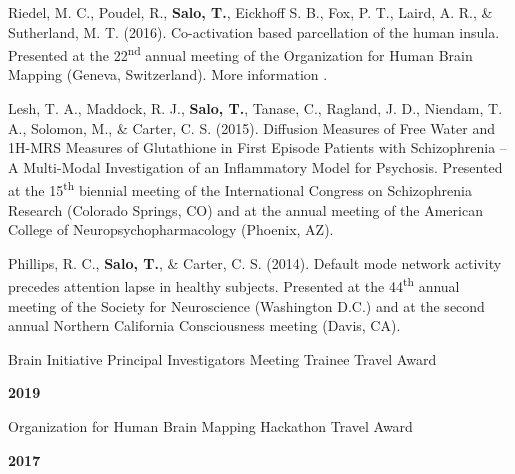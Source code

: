 \documentclass[10pt]{article}
\newcommand{\sectionstyle}{\LARGE \fontfamily{lmr}\selectfont}
\newcommand{\textlink}[3][blue]{\href{#2}{\color{#1}{#3}}}
\begin{document}
\begin{hangparas}{.25in}{1}
	\bigskip

	Riedel, M. C., Poudel, R., \textbf{Salo, T.}, Eickhoff S. B., Fox, P. T.,
	Laird, A. R., \& Sutherland, M. T. (2016).
	Co-activation based parcellation of the human insula.
	Presented at the 22\textsuperscript{nd} annual meeting of the Organization
	for Human Brain Mapping (Geneva, Switzerland).
	More information
	\textlink{https://osf.io/pqvqy}{here}.

	\bigskip

	Lesh, T. A., Maddock, R. J., \textbf{Salo, T.}, Tanase, C., Ragland, J. D.,
	Niendam, T. A., Solomon, M., \& Carter, C. S. (2015).
	Diffusion Measures of Free Water and 1H-MRS Measures of Glutathione in First
	Episode Patients with Schizophrenia -- A Multi-Modal Investigation of an
	Inflammatory Model for Psychosis.
	Presented at the 15\textsuperscript{th} biennial meeting of the International
	Congress on Schizophrenia Research (Colorado Springs, CO) and at
	the annual meeting of the American College of Neuropsychopharmacology
	(Phoenix, AZ).

	\bigskip

	Phillips, R. C., \textbf{Salo, T.}, \& Carter, C. S. (2014).
	Default mode network activity precedes attention lapse in healthy subjects.
	Presented at the 44\textsuperscript{th} annual meeting of the Society for
	Neuroscience (Washington D.C.) and at the second annual Northern California
	Consciousness meeting (Davis, CA).

\end{hangparas}

\bigskip

\begin{center}\sectionstyle{HONORS AND AWARDS}\end{center}

\begin{minipage}[t]{.85\linewidth}
\flushleft
\noindent
Brain Initiative Principal Investigators Meeting Trainee Travel Award
\end{minipage}
\hfill
\begin{minipage}[t]{.15\linewidth}
\flushright
\noindent
\textsc{\textbf{2019}}
\end{minipage}

\begin{minipage}[t]{.85\linewidth}
\flushleft
\noindent
Organization for Human Brain Mapping Hackathon Travel Award
\end{minipage}
\hfill
\begin{minipage}[t]{.15\linewidth}
\flushright
\noindent
\textsc{\textbf{2017}}
\end{minipage}
\end{document}
